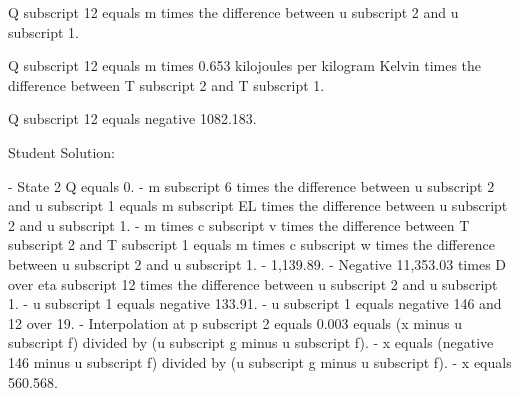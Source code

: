 Q subscript 12 equals m times the difference between u subscript 2 and u subscript 1.

Q subscript 12 equals m times 0.653 kilojoules per kilogram Kelvin times the difference between T subscript 2 and T subscript 1.

Q subscript 12 equals negative 1082.183.

Student Solution:

- State 2 Q equals 0.
- m subscript 6 times the difference between u subscript 2 and u subscript 1 equals m subscript EL times the difference between u subscript 2 and u subscript 1.
- m times c subscript v times the difference between T subscript 2 and T subscript 1 equals m times c subscript w times the difference between u subscript 2 and u subscript 1.
- 1,139.89.
- Negative 11,353.03 times D over eta subscript 12 times the difference between u subscript 2 and u subscript 1.
- u subscript 1 equals negative 133.91.
- u subscript 1 equals negative 146 and 12 over 19.
- Interpolation at p subscript 2 equals 0.003 equals (x minus u subscript f) divided by (u subscript g minus u subscript f).
- x equals (negative 146 minus u subscript f) divided by (u subscript g minus u subscript f).
- x equals 560.568.